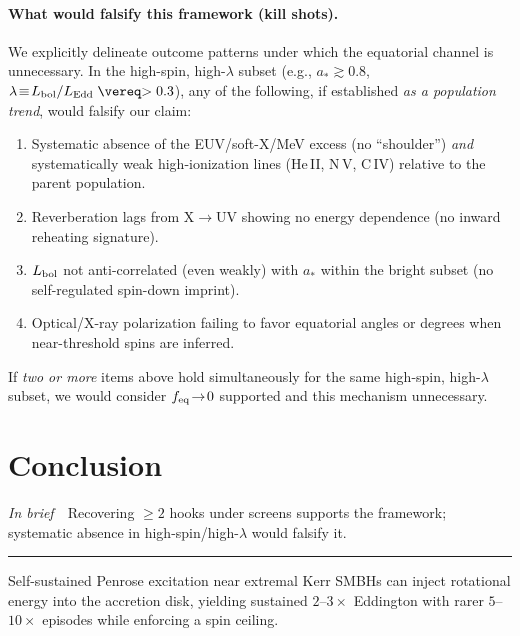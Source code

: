 \documentclass[twocolumn]{aastex701}
\providecommand{\tldr}[1]{%
  \noindent\textit{In brief}\ \textemdash\ #1%
  \par\smallskip
  \noindent\rule{\columnwidth}{0.2pt}\par\medskip
}
\begin{document}

\paragraph{What would falsify this framework (kill shots).}
We explicitly delineate outcome patterns under which the equatorial channel is unnecessary. In the high-spin, high-$\lambda$ subset (e.g., $a_*\gtrsim0.8$, $\lambda\!\equiv\!L_{\rm bol}/L_{\rm Edd}\gtrsim0.3$), any of the following, if established \emph{as a population trend}, would falsify our claim:
\begin{enumerate}
\item Systematic absence of the EUV/soft-X/MeV excess (no ``shoulder'') \emph{and} systematically weak high-ionization lines (He\,II, N\,V, C\,IV) relative to the parent population.
\item Reverberation lags from X$\rightarrow$UV showing no energy dependence (no inward reheating signature).
\item $L_{\rm bol}$ not anti-correlated (even weakly) with $a_*$ within the bright subset (no self-regulated spin-down imprint).
\item Optical/X-ray polarization failing to favor equatorial angles or degrees when near-threshold spins are inferred.
\end{enumerate}
If \emph{two or more} items above hold simultaneously for the same high-spin, high-$\lambda$ subset, we would consider $f_{\rm eq}\!\to\!0$ supported and this mechanism unnecessary.

\section{Conclusion}\label{sec:conclusion}
\tldr{Recovering $\ge2$ hooks under screens supports the framework; systematic absence in high-spin/high-$\lambda$ would falsify it.}
Self-sustained Penrose excitation near extremal Kerr SMBHs can inject rotational energy into the accretion disk, yielding sustained $2$--$3\times$ Eddington with rarer $5$--$10\times$ episodes while enforcing a spin ceiling.

\clearpage
\appendix
\end{document}
